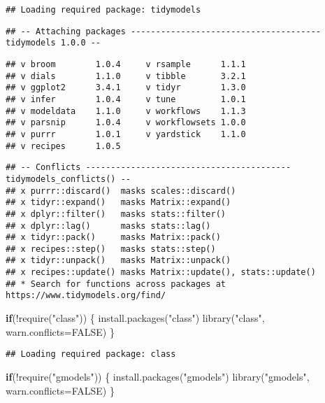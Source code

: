\documentclass[
]{article}
\newenvironment{Shaded}{\begin{snugshade}}{\end{snugshade}}
\newcommand{\AttributeTok}[1]{\textcolor[rgb]{0.77,0.63,0.00}{#1}}
\newcommand{\ConstantTok}[1]{\textcolor[rgb]{0.00,0.00,0.00}{#1}}
\newcommand{\ControlFlowTok}[1]{\textcolor[rgb]{0.13,0.29,0.53}{\textbf{#1}}}
\newcommand{\FunctionTok}[1]{\textcolor[rgb]{0.00,0.00,0.00}{#1}}
\newcommand{\NormalTok}[1]{#1}
\newcommand{\SpecialCharTok}[1]{\textcolor[rgb]{0.00,0.00,0.00}{#1}}
\newcommand{\StringTok}[1]{\textcolor[rgb]{0.31,0.60,0.02}{#1}}
\begin{document}
\begin{verbatim}
## Loading required package: tidymodels
\end{verbatim}

\begin{verbatim}
## -- Attaching packages -------------------------------------- tidymodels 1.0.0 --
\end{verbatim}

\begin{verbatim}
## v broom        1.0.4     v rsample      1.1.1
## v dials        1.1.0     v tibble       3.2.1
## v ggplot2      3.4.1     v tidyr        1.3.0
## v infer        1.0.4     v tune         1.0.1
## v modeldata    1.1.0     v workflows    1.1.3
## v parsnip      1.0.4     v workflowsets 1.0.0
## v purrr        1.0.1     v yardstick    1.1.0
## v recipes      1.0.5
\end{verbatim}

\begin{verbatim}
## -- Conflicts ----------------------------------------- tidymodels_conflicts() --
## x purrr::discard()  masks scales::discard()
## x tidyr::expand()   masks Matrix::expand()
## x dplyr::filter()   masks stats::filter()
## x dplyr::lag()      masks stats::lag()
## x tidyr::pack()     masks Matrix::pack()
## x recipes::step()   masks stats::step()
## x tidyr::unpack()   masks Matrix::unpack()
## x recipes::update() masks Matrix::update(), stats::update()
## * Search for functions across packages at https://www.tidymodels.org/find/
\end{verbatim}

\begin{Shaded}
\begin{Highlighting}[]
\ControlFlowTok{if}\NormalTok{(}\SpecialCharTok{!}\FunctionTok{require}\NormalTok{(}\StringTok{"class"}\NormalTok{)) \{}
  \FunctionTok{install.packages}\NormalTok{(}\StringTok{"class"}\NormalTok{)}
  \FunctionTok{library}\NormalTok{(}\StringTok{"class"}\NormalTok{, }\AttributeTok{warn.conflicts=}\ConstantTok{FALSE}\NormalTok{)}
\NormalTok{\}}
\end{Highlighting}
\end{Shaded}

\begin{verbatim}
## Loading required package: class
\end{verbatim}

\begin{Shaded}
\begin{Highlighting}[]
\ControlFlowTok{if}\NormalTok{(}\SpecialCharTok{!}\FunctionTok{require}\NormalTok{(}\StringTok{"gmodels"}\NormalTok{)) \{}
  \FunctionTok{install.packages}\NormalTok{(}\StringTok{"gmodels"}\NormalTok{)}
  \FunctionTok{library}\NormalTok{(}\StringTok{"gmodels"}\NormalTok{, }\AttributeTok{warn.conflicts=}\ConstantTok{FALSE}\NormalTok{)}
\NormalTok{\}}
\end{Highlighting}
\end{Shaded}
\end{document}
